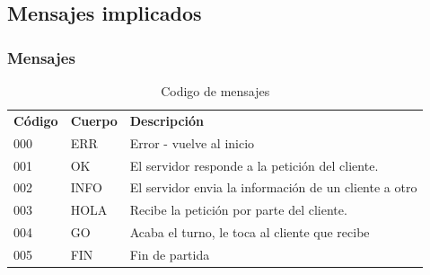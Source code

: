 \documentclass{beamer}
\begin{document}
\subsection{Mensajes implicados}
\begin{frame}
	\frametitle{Mensajes}
	\begin{table}[]
\centering

\label{my-label}
\begin{tabular}{lll}
\textbf{Código} & \textbf{Cuerpo} & \textbf{Descripción}                                  \\
000             & ERR             & Error - vuelve al inicio                              \\
001             & OK              & El servidor responde a la petición del cliente.       \\
002             & INFO            & El servidor envia la información de un cliente a otro \\
003             & HOLA            & Recibe la petición por parte del cliente.             \\
004				& GO			  & Acaba el turno, le toca al cliente que recibe		  \\
005				& FIN			  & Fin de partida
\end{tabular}
\caption{Codigo de mensajes}
\end{table}
\end{frame}
\end{document}
